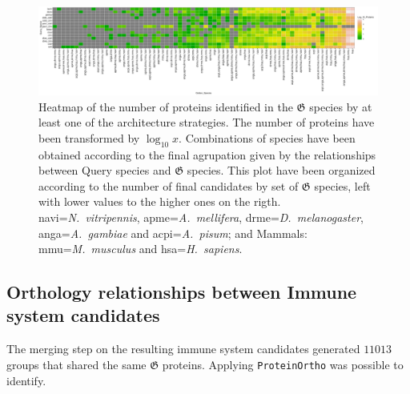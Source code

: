 \documentclass[11pt]{article}
\begin{document}
\begin{figure}
\includegraphics[width=\linewidth,keepaspectratio]{figures/matrix_spe}%
\caption{Heatmap of the number of proteins identified in the 
$\boldsymbol{\mathfrak{G}}$ species by at least one of the architecture 
strategies. The number of proteins have been transformed by $\log_{10} 
x$. Combinations of species have been obtained according to the final 
agrupation given by the relationships between Query species and 
$\boldsymbol{\mathfrak{G}}$ species. This plot have been organized according to 
the number of final candidates by set of  
$\boldsymbol{\mathfrak{G}}$ species, left with lower 
values to the higher ones on the rigth. \textsf{navi=}\textit{N.\ vitripennis}, 
\textsf{apme=}\textit{A.\ mellifera}, \textsf{drme=}\textit{D.\ melanogaster}, 
\textsf{anga=}\textit{A.\ gambiae} and \textsf{acpi=}\textit{A.\ pisum}; and 
Mammals: \textsf{mmu=}\textit{M.\ musculus} and \textsf{hsa=}\textit{H.\ 
sapiens}.}
\label{fig:matrix_relations}
\end{figure}

\subsection*{Orthology relationships between Immune system candidates} 
\label{Orthology}
The merging step on the resulting immune system candidates generated $11013$ 
groups that shared the same $\boldsymbol{\mathfrak{G}}$ proteins. Applying 
\texttt{ProteinOrtho} was possible to identify.

\end{document}
